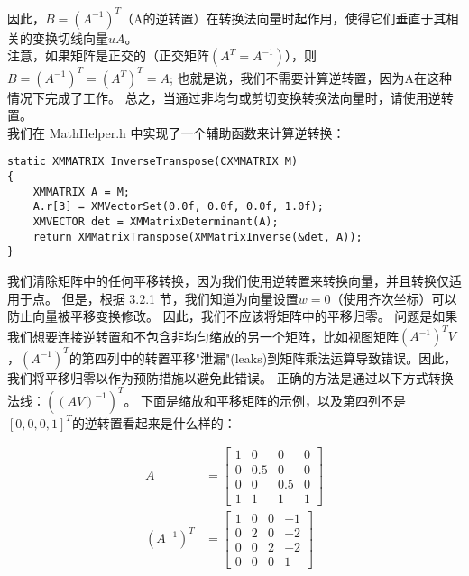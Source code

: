 \begin{flushleft}
因此，$B=(A^{-1})^{T}$（A的逆转置）在转换法向量时起作用，使得它们垂直于其相关的变换切线向量$uA$。\\

注意，如果矩阵是正交的（正交矩阵$(A^{T}=A^{-1})$），则$B=(A^{-1})^{T}=(A^{T})^{T}=A$; 也就是说，我们不需要计算逆转置，因为A在这种情况下完成了工作。 总之，当通过非均匀或剪切变换转换法向量时，请使用逆转置。\\
我们在 MathHelper.h 中实现了一个辅助函数来计算逆转换：\\
\end{flushleft}

\begin{lstlisting}
static XMMATRIX InverseTranspose(CXMMATRIX M)
{
    XMMATRIX A = M;
    A.r[3] = XMVectorSet(0.0f, 0.0f, 0.0f, 1.0f);
    XMVECTOR det = XMMatrixDeterminant(A);
    return XMMatrixTranspose(XMMatrixInverse(&det, A));
}
\end{lstlisting}

\begin{flushleft}
我们清除矩阵中的任何平移转换，因为我们使用逆转置来转换向量，并且转换仅适用于点。 但是，根据 3.2.1 节，我们知道为向量设置$w=0$（使用齐次坐标）可以防止向量被平移变换修改。 因此，我们不应该将矩阵中的平移归零。 问题是如果我们想要连接逆转置和不包含非均匀缩放的另一个矩阵，比如视图矩阵$(A^{-1})^{T}V$，$(A^{-1})^{T}$的第四列中的转置平移"泄漏"(leaks)到矩阵乘法运算导致错误。因此，我们将平移归零以作为预防措施以避免此错误。 正确的方法是通过以下方式转换法线：$((AV)^{-1})^{T}$。 下面是缩放和平移矩阵的示例，以及第四列不是$[0,0,0,1]^{T}$的逆转置看起来是什么样的：\\
\end{flushleft}

\begin{align*}
A&=
\begin{bmatrix}
1 & 0 & 0 & 0\\
0 & 0.5 & 0 & 0\\
0 & 0 & 0.5 & 0\\
1 & 1 & 1 & 1
\end{bmatrix}\\
(A^{-1})^{T}&=
\begin{bmatrix}
1 & 0 & 0 & -1\\
0 & 2 & 0 & -2\\
0 & 0 & 2 & -2\\
0 & 0 & 0 & 1
\end{bmatrix}
\end{align*}

